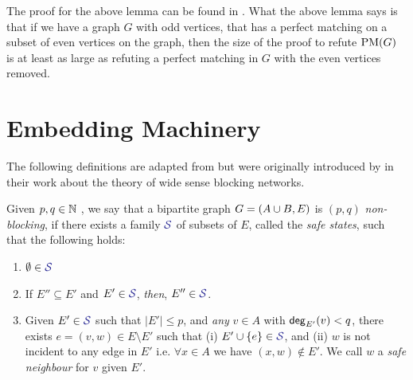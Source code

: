 \documentclass[11pt]{article}
\begin{document}
The proof for the above lemma can be found in \citep[Lemma 2.2]{Austrin_2022}.
What the above lemma says is that if we have a graph $G$ with odd vertices, that has a perfect matching on a subset of even vertices on the graph, then the size of the proof to refute $\text{PM}(G)$ is at least as large as refuting a perfect matching in $G$ with the even vertices removed.


\section{Embedding Machinery}
\label{sec:embed-machinery}
The following definitions are adapted from \citep{nenadov2023routing} but were originally introduced by \citet{feldman1988wide} in their work about the theory of wide sense blocking networks.

\begin{definition}
Given $p,q \in \mathbb{N}$ , we say that a bipartite graph $G = (A \cup B, E)$ is $(p, q)$ \emph{non-blocking}, if there exists a family $\Family{S}$ of subsets of $E$, called the \emph{safe states}, such that the following holds:

\begin{enumerate}
	\item $\emptyset \in \Family{S}$
	\item If $E'' \subseteq E'$ and $E' \in \Family{S}$, \emph{then}, $E'' \in \Family{S}$.
	\item Given $E' \in \Family{S}$ such that $|E'| \leq p$, and \emph{any} $v \in A$ with $\mathsf{deg}_{E'}(v) < q$, there exists $e = (v, w) \in E \setminus E'$  such that (i) $E' \cup \Set{e} \in \SafeStates $, and (ii) $w$ is not incident to any edge in $E'$ i.e. $\forall x \in A$ we have $(x,w) \notin E'$. 
 We call $w$ a \emph{safe neighbour} for $v$ given $E'$.
\end{enumerate}

\end{definition}
\end{document}
